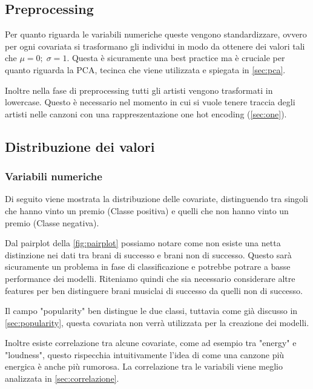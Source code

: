\subsection{Preprocessing}
Per quanto riguarda le variabili numeriche queste vengono standardizzare, ovvero per ogni covariata si trasformano gli individui in modo da ottenere dei valori tali che $\mu = 0;\; \sigma = 1$. Questa è sicuramente una best practice ma è cruciale per quanto riguarda la PCA, tecinca che viene utilizzata e spiegata in \autoref{sec:pca}.

Inoltre nella fase di preprocessing tutti gli artisti vengono trasformati in lowercase. Questo è necessario nel momento in cui si vuole tenere traccia degli artisti nelle canzoni con una rappreszentazione one hot encoding (\autoref{sec:one}).

\subsection{Distribuzione dei valori}
\subsubsection{Variabili numeriche}
Di seguito viene mostrata la distribuzione delle covariate, distinguendo tra singoli che hanno vinto un premio (Classe positiva) e quelli che non hanno vinto un premio (Classe negativa).

Dal pairplot della \autoref{fig:pairplot} possiamo notare come non esiste una netta distinzione nei dati tra brani di successo e brani non di successo. Questo sarà sicuramente un problema in fase di classificazione e potrebbe potrare a basse performance dei modelli. Riteniamo quindi che sia necessario considerare altre features per ben distinguere brani musiclai di successo da quelli non di successo.

Il campo "popularity" ben distingue le due classi, tuttavia come già discusso in \autoref{sec:popularity}, questa covariata non verrà utilizzata per la creazione dei modelli.

Inoltre esiste correlazione tra alcune covariate, come ad esempio tra "energy" e "loudness", questo rispecchia intuitivamente l'idea di come una canzone più energica è anche più rumorosa. La correlazione tra le variabili viene meglio analizzata in \autoref{sec:correlazione}.


